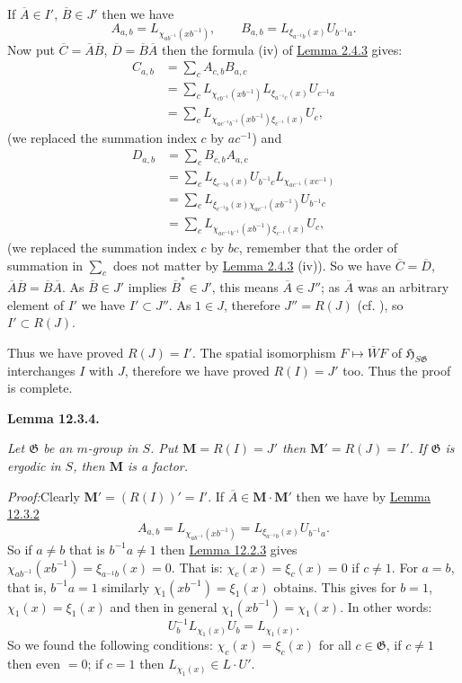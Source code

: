 \documentclass[12pt,b5paper,twoside]{article}
\newcommand{\Hspace}{\mathfrak H}
\newcommand{\M}{\mathbf M}
\newcommand{\Lemma}[1]{%
  \par\smallskip\noindent\phantomsection\label{lem:#1}\textbf{Lemma #1.}\enspace
}
\newcommand{\Proof}{\par\noindent\textit{Proof:}\enspace}
\newcommand{\lemref}[1]{\hyperref[lem:#1]{Lemma #1}}
\begin{document}
If $\overline A\in I'$, $\overline B\in J'$ then we have
\[
 A_{a,b}=L_{\chi_{ab^{-1}}(xb^{-1})},
 \qquad
 B_{a,b}=L_{\xi_{a^{-1}b}(x)}U_{b^{-1}a}.
\]
Now put $\overline C=\overline A\overline B$,
$\overline D=\overline B\overline A$ then the formula (iv) of
\lemref{2.4.3} gives:
\begin{align*}
 C_{a,b}
 &=\sum_cA_{c,b}B_{a,c}\\
 &=\sum_cL_{\chi_{cb^{-1}}(xb^{-1})}
          L_{\xi_{a^{-1}c}(x)}U_{c^{-1}a}\\
 &=\sum_cL_{\chi_{ac^{-1}b^{-1}}(xb^{-1})\xi_{c^{-1}}(x)}U_c,
\end{align*}
(we replaced the summation index $c$ by $ac^{-1}$) and
\begin{align*}
 D_{a,b}
 &=\sum_cB_{c,b}A_{a,c}\\
 &=\sum_cL_{\xi_{c^{-1}b}(x)}U_{b^{-1}c}
          L_{\chi_{ac^{-1}}(xc^{-1})}\\
 &=\sum_cL_{\xi_{c^{-1}b}(x)\chi_{ac^{-1}}(xb^{-1})}U_{b^{-1}c}\\
 &=\sum_cL_{\chi_{ac^{-1}b^{-1}}(xb^{-1})\xi_{c^{-1}}(x)}U_c,
\end{align*}
(we replaced the summation index $c$ by $bc$, remember that the order of
summation in $\sum_c$ does not matter by \lemref{2.4.3} (iv)). So we have
$\overline C=\overline D$, $\overline A\overline B=\overline B\overline A$.
As $\overline B\in J'$ implies $\overline B^*\in J'$, this means
$\overline A\in J''$; as $\overline A$ was an arbitrary element of $I'$ we
have $I'\subset J''$. As $1\in J$, therefore $J''=R(J)$
(cf. \cite[p.~397]{ref18}), so $I'\subset R(J)$.

Thus we have proved $R(J)=I'$. The spatial isomorphism
$F\mapsto\overline WF$ of $\Hspace_{S\mathfrak G}$ interchanges $I$ with
$J$, therefore we have proved $R(I)=J'$ too. Thus the proof is complete.

\Lemma{12.3.4}
\emph{Let $\mathfrak G$ be an $m$-group in $S$. Put $\M=R(I)=J'$ then
$\M'=R(J)=I'$. If $\mathfrak G$ is ergodic in $S$, then $\M$ is a factor.}

\Proof Clearly $\M'=(R(I))'=I'$. If
$\overline A\in\M\cdot\M'$ then we have by \lemref{12.3.2}
\[
 A_{a,b}=L_{\chi_{ab^{-1}}(xb^{-1})}
 =L_{\xi_{a^{-1}b}(x)}U_{b^{-1}a}.
\]
So if $a\neq b$ that is $b^{-1}a\neq1$ then \lemref{12.2.3} gives
$\chi_{ab^{-1}}(xb^{-1})=\xi_{a^{-1}b}(x)=0$. That is:
$\chi_c(x)=\xi_c(x)=0$ if $c\neq1$. For $a=b$, that is, $b^{-1}a=1$
similarly $\chi_1(xb^{-1})=\xi_1(x)$ obtains. This gives for $b=1$,
$\chi_1(x)=\xi_1(x)$ and then in general
$\chi_1(xb^{-1})=\chi_1(x)$. In other words:
\[
 U_b^{-1}L_{\chi_1(x)}U_b=L_{\chi_1(x)}.
\]
So we found the following conditions: $\chi_c(x)=\xi_c(x)$ for all
$c\in\mathfrak G$, if $c\neq1$ then even $=0$; if $c=1$ then
$L_{\chi_1(x)}\in L\cdot U'$.
\end{document}
